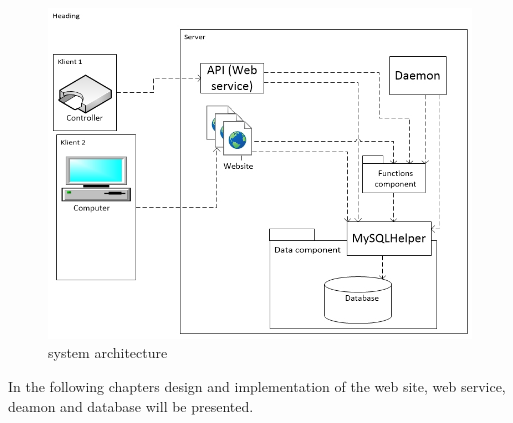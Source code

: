 \begin{figure}
	\centering
		\includegraphics[width=1.00\textwidth]{images/serveroverview.jpg}
	\caption{system architecture}
	\label{fig:serveroverview}
\end{figure}

In the following chapters design and implementation of the web site, web service, deamon and database will be presented.

 


